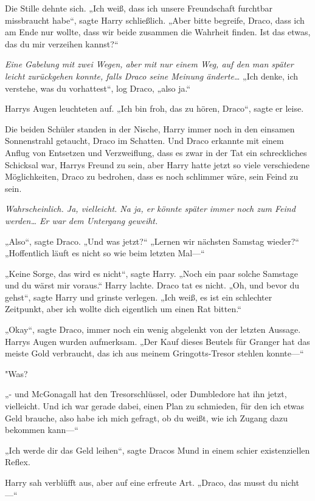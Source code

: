{Die Stille dehnte sich. „Ich weiß, dass ich unsere Freundschaft furchtbar missbraucht habe“, sagte Harry schließlich. „Aber bitte begreife, Draco, dass ich am Ende nur wollte, dass wir beide zusammen die Wahrheit finden. Ist das etwas, das du mir verzeihen kannst?“

\emph{Eine Gabelung mit zwei Wegen, aber mit nur einem Weg, auf den man später leicht zurückgehen konnte, falls Draco seine Meinung änderte…} „Ich denke, ich verstehe, was du vorhattest“, log Draco, „also ja.“

Harrys Augen leuchteten auf. „Ich bin froh, das zu hören, Draco“, sagte er leise.

Die beiden Schüler standen in der Nische, Harry immer noch in den einsamen Sonnenstrahl getaucht, Draco im Schatten. Und Draco erkannte mit einem Anflug von Entsetzen und Verzweiflung, dass es zwar in der Tat ein schreckliches Schicksal war, Harrys Freund zu sein, aber Harry hatte jetzt so viele verschiedene Möglichkeiten, Draco zu bedrohen, dass es noch schlimmer wäre, sein Feind zu sein.

\emph{Wahrscheinlich. Ja, vielleicht. Na ja, er könnte später immer noch zum Feind werden… Er war dem Untergang geweiht.}

„Also“, sagte Draco. „Und was jetzt?“ „Lernen wir nächsten Samstag wieder?“ „Hoffentlich läuft es nicht so wie beim letzten Mal—“

„Keine Sorge, das wird es nicht“, sagte Harry. „Noch ein paar solche Samstage und du wärst mir voraus.“ Harry lachte. Draco tat es nicht. „Oh, und bevor du gehst“, sagte Harry und grinste verlegen. „Ich weiß, es ist ein schlechter Zeitpunkt, aber ich wollte dich eigentlich um einen Rat bitten.“

„Okay“, sagte Draco, immer noch ein wenig abgelenkt von der letzten Aussage. Harrys Augen wurden aufmerksam. „Der Kauf dieses Beutels für Granger hat das meiste Gold verbraucht, das ich aus meinem Gringotts-Tresor stehlen konnte—“

"Was?

„- und McGonagall hat den Tresorschlüssel, oder Dumbledore hat ihn jetzt, vielleicht. Und ich war gerade dabei, einen Plan zu schmieden, für den ich etwas Geld brauche, also habe ich mich gefragt, ob du weißt, wie ich Zugang dazu bekommen kann—“

„Ich werde dir das Geld leihen“, sagte Dracos Mund in einem schier existenziellen Reflex.

Harry sah verblüfft aus, aber auf eine erfreute Art. „Draco, das musst du nicht—“

}
